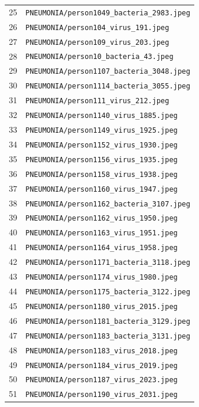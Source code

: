 \begin{longtable}{r p{12cm}}
25 & \texttt{PNEUMONIA/person1049\_bacteria\_2983.jpeg} \\
26 & \texttt{PNEUMONIA/person104\_virus\_191.jpeg} \\
27 & \texttt{PNEUMONIA/person109\_virus\_203.jpeg} \\
28 & \texttt{PNEUMONIA/person10\_bacteria\_43.jpeg} \\
29 & \texttt{PNEUMONIA/person1107\_bacteria\_3048.jpeg} \\
30 & \texttt{PNEUMONIA/person1114\_bacteria\_3055.jpeg} \\
31 & \texttt{PNEUMONIA/person111\_virus\_212.jpeg} \\
32 & \texttt{PNEUMONIA/person1140\_virus\_1885.jpeg} \\
33 & \texttt{PNEUMONIA/person1149\_virus\_1925.jpeg} \\
34 & \texttt{PNEUMONIA/person1152\_virus\_1930.jpeg} \\
35 & \texttt{PNEUMONIA/person1156\_virus\_1935.jpeg} \\
36 & \texttt{PNEUMONIA/person1158\_virus\_1938.jpeg} \\
37 & \texttt{PNEUMONIA/person1160\_virus\_1947.jpeg} \\
38 & \texttt{PNEUMONIA/person1162\_bacteria\_3107.jpeg} \\
39 & \texttt{PNEUMONIA/person1162\_virus\_1950.jpeg} \\
40 & \texttt{PNEUMONIA/person1163\_virus\_1951.jpeg} \\
41 & \texttt{PNEUMONIA/person1164\_virus\_1958.jpeg} \\
42 & \texttt{PNEUMONIA/person1171\_bacteria\_3118.jpeg} \\
43 & \texttt{PNEUMONIA/person1174\_virus\_1980.jpeg} \\
44 & \texttt{PNEUMONIA/person1175\_bacteria\_3122.jpeg} \\
45 & \texttt{PNEUMONIA/person1180\_virus\_2015.jpeg} \\
46 & \texttt{PNEUMONIA/person1181\_bacteria\_3129.jpeg} \\
47 & \texttt{PNEUMONIA/person1183\_bacteria\_3131.jpeg} \\
48 & \texttt{PNEUMONIA/person1183\_virus\_2018.jpeg} \\
49 & \texttt{PNEUMONIA/person1184\_virus\_2019.jpeg} \\
50 & \texttt{PNEUMONIA/person1187\_virus\_2023.jpeg} \\
51 & \texttt{PNEUMONIA/person1190\_virus\_2031.jpeg} \\

\end{longtable}
